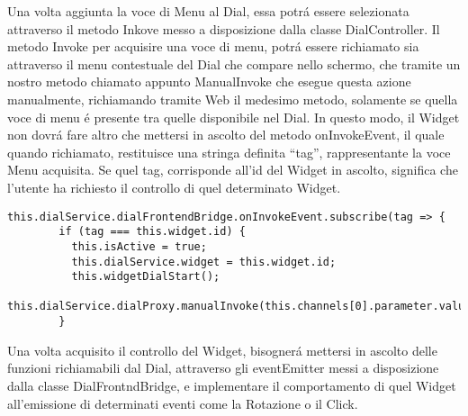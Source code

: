 Una volta aggiunta la voce di Menu al Dial, essa potrá essere selezionata attraverso il metodo Inkove messo a disposizione dalla classe DialController. Il metodo Invoke per acquisire una voce di menu, potrá essere richiamato sia attraverso il menu contestuale del Dial che compare nello schermo, che tramite un nostro metodo chiamato appunto ManualInvoke che esegue questa azione manualmente, richiamando tramite Web il medesimo metodo, solamente se quella voce di menu é presente tra quelle disponibile nel Dial.
In questo modo, il Widget non dovrá fare altro che mettersi in ascolto del metodo onInvokeEvent, il quale quando richiamato, restituisce una stringa definita “tag”, rappresentante la voce Menu acquisita.
Se quel tag, corrisponde all’id del Widget in ascolto, significa che l’utente ha richiesto il controllo di quel determinato Widget.

\vspace{1.0cm}
\begin{lstlisting}[caption={Ascolto Invoke della voce di menu'},style=javaScriptCode]
  this.dialService.dialFrontendBridge.onInvokeEvent.subscribe(tag => {
        if (tag === this.widget.id) {
          this.isActive = true;
          this.dialService.widget = this.widget.id;
          this.widgetDialStart();
          this.dialService.dialProxy.manualInvoke(this.channels[0].parameter.value);
        }
\end{lstlisting} 
\vspace{1.0cm}

Una volta acquisito il controllo del Widget, bisognerá mettersi in ascolto delle funzioni richiamabili dal Dial, attraverso gli eventEmitter messi a disposizione dalla classe DialFrontndBridge, e implementare il comportamento di quel Widget all’emissione di determinati eventi come la Rotazione o il Click.


